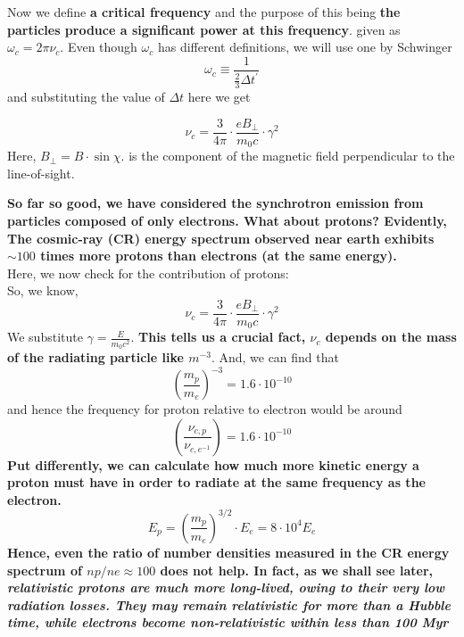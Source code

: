 \documentclass[11pt]{report}
\newcommand{\tbf}[1]{\textbf{#1}}
\newcommand{\tit}[1]{\textit{#1}}
\newcommand{\cbox}{tcolorbox}
\newcommand{\cc}[1]{\left({#1}\right)}
\begin{document}
Now we define \tbf{a critical frequency} and the purpose of this being \tbf{the particles produce a significant power at this frequency}. given as $\omega_c =2 \pi \nu_c$. Even though $\omega_c$ has different definitions, we will use one by Schwinger 
\begin{equation}
\omega_c\equiv \frac{1}{\frac{2}{3}\Delta t^\prime}
\end{equation}
and substituting the value of $\Delta t$ here we get
\begin{\cbox}
\begin{equation}
\nu_c=\frac{3}{4 \pi}\cdot \frac{e B_{\perp}}{m_0c}\cdot \gamma^2
\end{equation}
Here, $B_{\perp}=B \cdot \sin \chi$. is the component of the magnetic field perpendicular to the line-of-sight.
\end{\cbox}
\textbf{So far so good, we have considered the synchrotron emission from particles composed of only electrons. What about protons? Evidently, The cosmic-ray (CR) energy spectrum observed near earth exhibits $\sim 100$ times more protons than electrons (at the same energy).}\\
Here, we now check for the contribution of protons:\\
So, we know,
\begin{equation}
\nu_c=\frac{3}{4 \pi}\cdot \frac{e B_{\perp}}{m_0c}\cdot \gamma^2
\end{equation}
We substitute $\gamma= \frac{E}{m_0c^2}$. 
\textbf{This tells us a crucial fact, $\nu_c$ depends on the mass of the radiating particle like $m^{-3}$}. And, we can find that
\begin{equation}
\cc{\frac{m_p}{m_e}}^{-3}=1.6 \cdot 10^{-10}
\end{equation}
and hence the frequency for proton relative to electron would be around
\begin{equation}
\cc{\frac{\nu_{c,p}}{\nu_{c,e^{-1}}}}=1.6 \cdot 10^{-10}
\end{equation}
\textbf{Put differently, we can calculate how much more kinetic energy a proton must have in order to radiate at the same frequency as the electron.}
\begin{equation}
E_p=\cc{\frac{m_p}{m_e}}^{3/2}\cdot E_e =8\cdot 10^4 E_e
\end{equation}
\textbf{Hence, even the ratio of number densities measured in the CR energy spectrum of $np/ne \approx 100$ does not help. In fact, as we shall see later, \tit{relativistic protons are much more long-lived, owing to their very low radiation losses. They may remain relativistic for more than a Hubble time, while electrons become non-relativistic within less than 100 Myr}}\\
\end{document}
